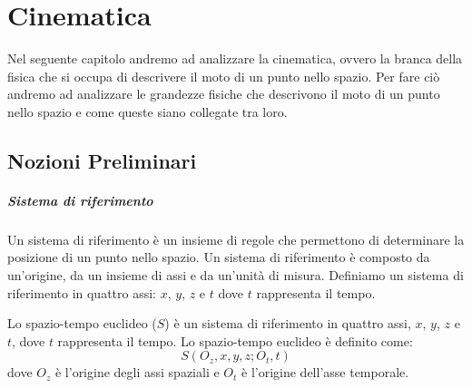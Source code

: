 \chapter{Cinematica}
Nel seguente capitolo andremo ad analizzare la cinematica, ovvero la branca della fisica che si occupa di descrivere il moto di un punto nello spazio. Per fare ciò andremo ad analizzare le grandezze fisiche che descrivono il moto di un punto nello spazio e come queste siano collegate tra loro.

\section{Nozioni Preliminari}

    \paragraph{Sistema di riferimento} Un sistema di riferimento è un insieme di regole che permettono di determinare la posizione di un punto nello spazio. Un sistema di riferimento è composto da un'origine, da un insieme di assi e da un'unità di misura. Definiamo un sistema di riferimento in quattro assi: $x$, $y$, $z$ e $t$ dove $t$ rappresenta il tempo.
    \begin{definition}
        Lo spazio-tempo euclideo ($S$) è un sistema di riferimento in quattro assi, $x$, $y$, $z$ e $t$, dove $t$ rappresenta il tempo. Lo spazio-tempo euclideo è definito come:
        $$
            S(O_z, x, y, z; O_t, t)
        $$
        dove $O_z$ è l'origine degli assi spaziali e $O_t$ è l'origine dell'asse temporale.
    \end{definition}

